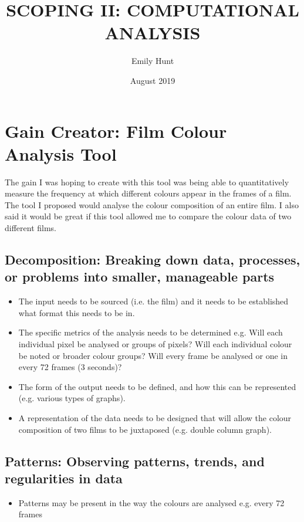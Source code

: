 \documentclass{article}
\title{\textbf{SCOPING II: COMPUTATIONAL ANALYSIS}}
\author{Emily Hunt}
\date{August 2019}
\begin{document}
\maketitle

\section*{Gain Creator: Film Colour Analysis Tool}
The gain I was hoping to create with this tool was being able to quantitatively measure the frequency at which different colours appear in the frames of a film. The tool I proposed would analyse the colour composition of an entire film. I also said it would be great if this tool allowed me to compare the colour data of two different films.

\subsection*{Decomposition: Breaking down data, processes, or problems into smaller, manageable parts}
\begin{itemize}
\item The input needs to be sourced (i.e. the film) and it needs to be established what format this needs to be in.
\item The specific metrics of the analysis needs to be determined e.g. Will each individual pixel be analysed or groups of pixels? Will each individual colour be noted or broader colour groups? Will every frame be analysed or one in every 72 frames (3 seconds)?
\item The form of the output needs to be defined, and how this can be represented (e.g. various types of graphs).
\item A representation of the data needs to be designed that will allow the colour composition of two films to be juxtaposed (e.g. double column graph).
\end{itemize}

\subsection*{Patterns: Observing patterns, trends, and regularities in data}
\begin{itemize}
    \item Patterns may be present in the way the colours are analysed e.g. every 72 frames
\end{itemize}
\end{document}

